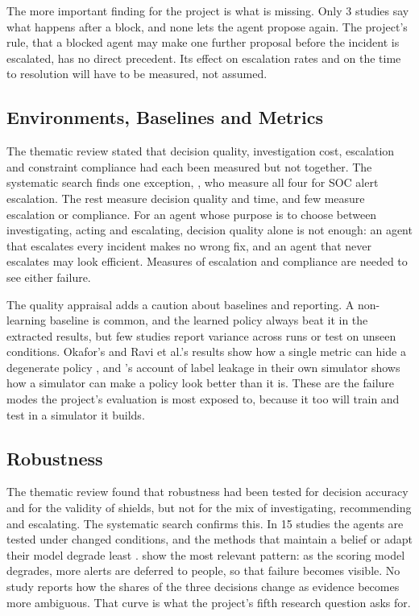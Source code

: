\documentclass[pdflatex,sn-basic]{sn-jnl}
\begin{document}
The more important finding for the project is what is missing. Only 3 studies say what happens after a block, and none lets the agent propose again. The project's rule, that a blocked agent may make one further proposal before the incident is escalated, has no direct precedent. Its effect on escalation rates and on the time to resolution will have to be measured, not assumed.

\subsection{Environments, Baselines and Metrics}

The thematic review stated that decision quality, investigation cost, escalation and constraint compliance had each been measured but not together. The systematic search finds one exception, \citet{kovtun2026}, who measure all four for SOC alert escalation. The rest measure decision quality and time, and few measure escalation or compliance. For an agent whose purpose is to choose between investigating, acting and escalating, decision quality alone is not enough: an agent that escalates every incident makes no wrong fix, and an agent that never escalates may look efficient. Measures of escalation and compliance are needed to see either failure.

The quality appraisal adds a caution about baselines and reporting. A non-learning baseline is common, and the learned policy always beat it in the extracted results, but few studies report variance across runs or test on unseen conditions. Okafor's and Ravi et al.'s results show how a single metric can hide a degenerate policy \citep{okafor2026,ravi2025}, and \citeauthor{sahin2026}'s \citeyearpar{sahin2026} account of label leakage in their own simulator shows how a simulator can make a policy look better than it is. These are the failure modes the project's evaluation is most exposed to, because it too will train and test in a simulator it builds.

\subsection{Robustness}

The thematic review found that robustness had been tested for decision accuracy and for the validity of shields, but not for the mix of investigating, recommending and escalating. The systematic search confirms this. In 15 studies the agents are tested under changed conditions, and the methods that maintain a belief or adapt their model degrade least \citep{hammar2025,hammar2026belief}. \citet{sahin2026} show the most relevant pattern: as the scoring model degrades, more alerts are deferred to people, so that failure becomes visible. No study reports how the shares of the three decisions change as evidence becomes more ambiguous. That curve is what the project's fifth research question asks for.
\end{document}
